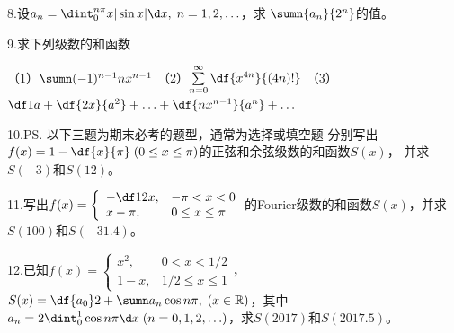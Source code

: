 8.\;设$a_n=\dint_0^{n\pi}x|\sin x|\d x,\;n=1,2,\ldots$，求
$\sumn{a_n}{2^n}$的值。

9.\;求下列级数的和函数

（1）$\sumn(-1)^{n-1}nx^{n-1}$\quad 
（2）$\sum\limits_{n=0}^{\infty}\df{x^{4n}}{(4n)!}$\quad
（3）$\df1a+\df{2x}{a^2}+\ldots+\df{nx^{n-1}}{a^n}+\ldots$

10.\;\ps{以下三题为期末必考的题型，通常为选择或填空题}
分别写出$f(x)=1-\df{x}{\pi}\;(0\leq x\leq\pi)$的正弦和余弦级数的和函数$S(x)$，
并求$S(-3)$和$S(12)$。

11.\;写出$f(x)=\left\{\begin{array}{ll}
	-\df12x,&-\pi<x<0\\ x-\pi,&0\leq x\leq \pi
\end{array}\right.$的Fourier级数的和函数$S(x)$，并求$S(100)$和$S(-31.4)$。

12.\;已知$f(x)=\left\{\begin{array}{ll}
	x^2,&0<x<1/2\\ 1-x,&1/2\leq x\leq 1
\end{array}\right.$，
$S(x)=\df{a_0}2+\sumn a_n\cos n\pi,\;(x\in\mathbb{R})$，其中
$a_n=2\dint_0^1\cos n\pi\d x\;(n=0,1,2,\ldots)$，求$S(2017)$和$S(2017.5)$。